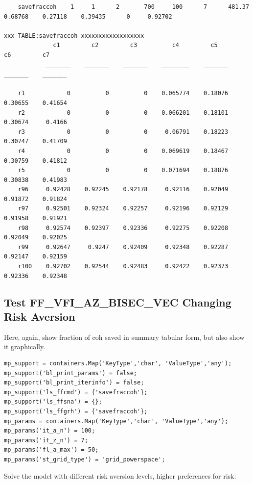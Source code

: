 \documentclass[
]{book}
\begin{document}
\begin{verbatim}
    savefraccoh    1     1      2       700     100      7      481.37    0.68768    0.27118    0.39435      0     0.92702

xxx TABLE:savefraccoh xxxxxxxxxxxxxxxxxx
              c1         c2         c3          c4         c5         c6         c7   
            _______    _______    _______    ________    _______    _______    _______

    r1            0          0          0    0.065774    0.18076    0.30655    0.41654
    r2            0          0          0    0.066201    0.18101    0.30674     0.4166
    r3            0          0          0     0.06791    0.18223    0.30747    0.41709
    r4            0          0          0    0.069619    0.18467    0.30759    0.41812
    r5            0          0          0    0.071694    0.18876    0.30838    0.41983
    r96     0.92428    0.92245    0.92178     0.92116    0.92049    0.91872    0.91824
    r97     0.92501    0.92324    0.92257     0.92196    0.92129    0.91958    0.91921
    r98     0.92574    0.92397    0.92336     0.92275    0.92208    0.92049    0.92025
    r99     0.92647     0.9247    0.92409     0.92348    0.92287    0.92147    0.92159
    r100    0.92702    0.92544    0.92483     0.92422    0.92373    0.92336    0.92348
\end{verbatim}

\hypertarget{test-ff_vfi_az_bisec_vec-changing-risk-aversion}{%
\subsection{Test FF\_VFI\_AZ\_BISEC\_VEC Changing Risk Aversion}\label{test-ff_vfi_az_bisec_vec-changing-risk-aversion}}

Here, again, show fraction of coh saved in summary tabular form, but
also show it graphically.

\begin{verbatim}
mp_support = containers.Map('KeyType','char', 'ValueType','any');
mp_support('bl_print_params') = false;
mp_support('bl_print_iterinfo') = false;
mp_support('ls_ffcmd') = {'savefraccoh'};
mp_support('ls_ffsna') = {};
mp_support('ls_ffgrh') = {'savefraccoh'};
mp_params = containers.Map('KeyType','char', 'ValueType','any');
mp_params('it_a_n') = 100;
mp_params('it_z_n') = 7;
mp_params('fl_a_max') = 50;
mp_params('st_grid_type') = 'grid_powerspace';
\end{verbatim}

Solve the model with different risk aversion levels, higher preferences
for risk:
\end{document}
